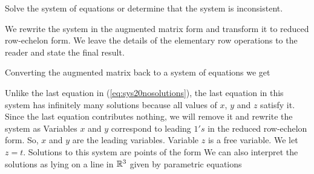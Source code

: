 \documentclass{ximera}
\begin{document}
\begin{example}\label{ex:rrefinfmanysolutionssys}
Solve the system of equations or determine that the system is inconsistent.
    
    \begin{explanation}
    We rewrite the system in the augmented matrix form and transform it to reduced row-echelon form.  We leave the details of the elementary row operations to the reader and state the final result.
    
 Converting the augmented matrix back to a system of equations we get
    
 Unlike the last equation in (\ref{eq:sys20nosolutions}), the last equation in this system has infinitely many solutions because all values of $x$, $y$ and $z$ satisfy it.  Since the last equation contributes nothing, we will remove it and rewrite the system as
Variables $x$ and $y$ correspond to leading $1's$ in the reduced row-echelon form.  So, $x$ and $y$ are the leading variables.    Variable $z$ is a free variable.  We let $z=t$.  Solutions to this system are points of the form
  We can also interpret the solutions as lying on a line in $\mathbb{R}^3$ given by parametric equations
  

\end{explanation}
\end{example}
\end{document}
